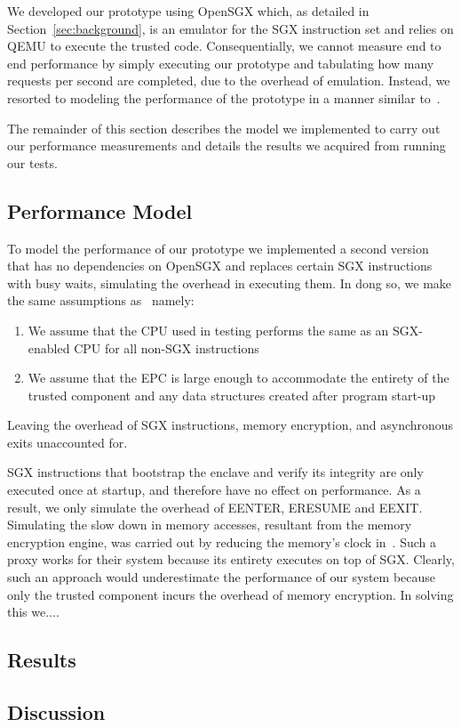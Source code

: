 \documentclass[../main.tex]{subfiles}
\begin{document}
We developed our prototype using OpenSGX which, as detailed in
Section~\ref{sec:background}, is an emulator for the SGX instruction set and
relies on QEMU to execute the trusted code. Consequentially, we cannot measure
end to end performance by simply executing our prototype and tabulating how
many requests per second are completed, due to the overhead of emulation.
Instead, we resorted to modeling the performance of the prototype in a manner
similar to~\cite{Baumann14}.

The remainder of this section describes the model we implemented to carry out
our performance measurements and details the results we acquired from running
our tests.
\subsection{Performance Model}
To model the performance of our prototype we implemented a second version
that has no dependencies on OpenSGX and replaces certain SGX
instructions with busy waits, simulating the overhead in executing
them. In dong so, we make the same assumptions as~\cite{Baumann14} namely: 
	\begin{enumerate}
		\item We assume that the CPU used in testing performs
                  the same as an SGX-enabled CPU for all non-SGX instructions
		\item We assume that the EPC is large enough to
                  accommodate the entirety of the trusted component
                  and any data structures created after program start-up 
	\end{enumerate}
Leaving the overhead of SGX instructions, memory encryption, and
asynchronous exits unaccounted for. 

SGX instructions that bootstrap the enclave and verify its integrity
are only executed once at startup, and therefore have no effect on
performance. As a result, we only simulate the overhead of EENTER,
ERESUME and EEXIT. Simulating the slow down in memory accesses,
resultant from the memory encryption engine, was carried out by
reducing the memory's clock in~\cite{Baumann14}. Such a proxy works
for their system because its entirety executes on top of SGX. Clearly,
such an approach would underestimate the performance of our system
because only the trusted component incurs the overhead of memory encryption.
In solving this we....%

\subsection{Results}
\subsection{Discussion}
\end{document}
